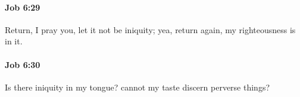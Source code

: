 		\paragraph{Job 6:29} %
			\label{JOB-6-29}

			Return, I pray you, let it not be iniquity; yea, return again, my righteousness is in it.


		\paragraph{Job 6:30} %
			\label{JOB-6-30}

			Is there iniquity in my tongue? cannot my taste discern perverse things?

